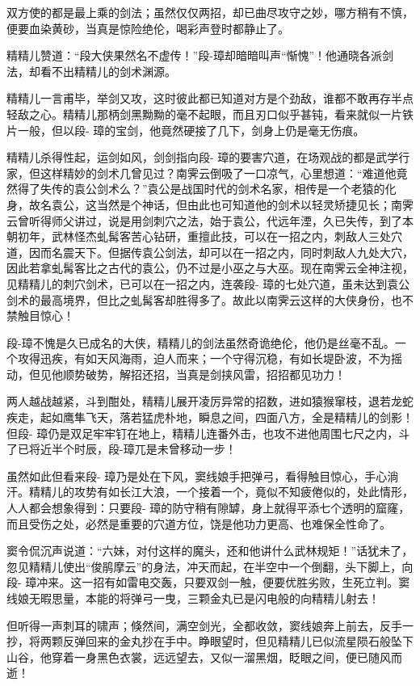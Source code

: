 \documentclass[12pt,oneside]{book}
\begin{document}
双方使的都是最上乘的剑法；虽然仅仅两招，却已曲尽攻守之妙，哪方稍有不慎，便要血染黄砂，当真是惊险绝伦，喝彩声登时都静止了。

精精儿赞道：``段大侠果然名不虚传！''段-璋却暗暗叫声``惭愧''！他通晓各派剑法，却看不出精精儿的剑术渊源。

精精儿一言甫毕，举剑又攻，这时彼此都已知道对方是个劲敌，谁都不敢再存半点轻敌之心。精精儿那柄剑黑黝黝的毫不起眼，而且刃口似乎甚钝，看来就似一片铁片一般，但以段-
璋的宝剑，他竟然硬接了几下，剑身上仍是毫无伤痕。

精精儿杀得性起，运剑如风，剑剑指向段-
璋的要害穴道，在场观战的都是武学行家，但这样精妙的剑术几曾见过？南霁云倒吸了一口凉气，心里想道：``难道他竟然得了失传的袁公剑术么？''袁公是战国时代的剑术名家，相传是一个老猿的化身，故名袁公，这当然是个神话，但由此也可知道他的剑术以轻灵矫捷见长；南霁云曾听得师父讲过，说是用剑刺穴之法，始于袁公，代远年湮，久已失传，到了本朝初年，武林怪杰虬髯客苦心钻研，重擅此技，可以在一招之内，刺敌人三处穴道，因而名震天下。但据传袁公剑法，却可以在一招之内，同时刺敌人九处大穴，因此若拿虬髯客比之古代的袁公，仍不过是小巫之与大巫。现在南霁云全神注视，见精精儿的刺穴剑术，已可以在一招之内，连袭段-
璋的七处穴道，虽未达到袁公剑术的最高境界，但比之虬髯客却胜得多了。故此以南霁云这样的大侠身份，也不禁触目惊心！

段-璋不愧是久已成名的大侠，精精儿的剑法虽然奇诡绝伦，他仍是丝毫不乱。一个攻得迅疾，有如天风海雨，迫人而来；一个守得沉稳，有如长堤卧波，不为摇动，但见他顺势破势，解招还招，当真是剑挟风雷，招招都见功力！

两人越战越紧，斗到酣处，精精儿展开凌厉异常的招数，进如猿猴窜枝，退若龙蛇疾走，起如鹰隼飞天，落若猛虎朴地，瞬息之间，四面八方，全是精精儿的剑影！但段-
璋仍是双足牢牢钉在地上，精精儿连番外击，也攻不进他周围七尺之内，斗了已将近半个时辰，段-璋兀是未曾移动一步！

虽然如此但看来段-
璋乃是处在下风，窦线娘手把弹弓，看得触目惊心，手心淌汗。精精儿的攻势有如长江大浪，一个接着一个，竟似不知疲倦似的，处此情形，人人都会想象得到：只要段-
璋的防守稍有隙罅，身上就得平添七个透明的窟窿，而且受伤之处，必然是重要的穴道方位，饶是他功力更高、也难保全性命了。

窦令侃沉声说道：``六妹，对付这样的魔头，还和他讲什么武林规矩！''话犹未了，忽见精精儿使出``俊鹃摩云''的身法，冲天而起，在半空中一个倒翻，头下脚上，向段-
璋冲来。这一招有如雷电交轰，只要双剑一触，便要优胜劣败，生死立判。窦线娘无暇思量，本能的将弹弓一曳，三颗金丸已是闪电般的向精精儿射去！

但听得一声刺耳的啸声；倏然间，满空剑光，全都收敛，窦线娘奔上前去，反手一抄，将两颗反弹回来的金丸抄在手中。睁眼望时，但见精精儿已似流星陨石般坠下山谷，他穿着一身黑色衣裳，远远望去，又似一溜黑烟，眨眼之间，便已随风而逝！
\end{document}

